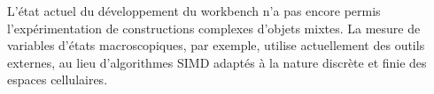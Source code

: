 L'état actuel du développement du workbench n'a pas encore permis
l'expérimentation de constructions complexes d'objets mixtes. %
La mesure de variables d'états macroscopiques, par exemple, utilise
actuellement des outils externes, au lieu d'algorithmes SIMD adaptés à
la nature discrète et finie des espaces cellulaires. %

